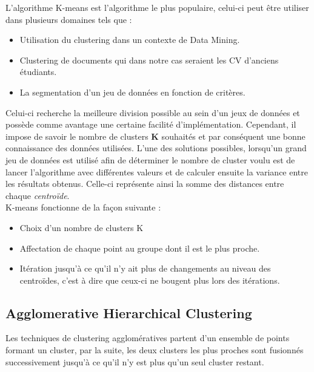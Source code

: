 \documentclass[memoire.tex]{subfiles}
\begin{document}
L'algorithme K-means est l'algorithme le plus populaire, celui-ci peut être utiliser dans plusieurs domaines tels que : 
\begin{itemize}
\item Utilisation du clustering dans un contexte de Data Mining.
\item Clustering de documents qui dans notre cas seraient les CV d'anciens étudiants.
\item La segmentation d'un jeu de données en fonction de critères.
\end{itemize}
Celui-ci recherche la meilleure division possible au sein d'un jeux de données \cite{ref5} et possède comme avantage une certaine facilité d'implémentation. Cependant, il impose de savoir le nombre de clusters \textbf{K} souhaités et par conséquent une bonne connaissance des données utilisées. L'une des solutions possibles, lorsqu'un grand jeu de données est utilisé afin de déterminer le nombre de cluster voulu est de lancer l'algorithme avec différentes valeurs et de calculer ensuite la variance entre les résultats obtenus. Celle-ci représente ainsi la somme des distances entre chaque \textit{centroïde}.\\
K-means fonctionne de la façon suivante : 
\begin{itemize}
\item Choix d'un nombre de clusters K
\item Affectation de chaque point au groupe dont il est le plus proche.
\item Itération jusqu'à ce qu'il n'y ait plus de changements au niveau des centroïdes, c'est à dire que ceux-ci ne bougent plus lors des itérations.
\end{itemize}

\subsection{Agglomerative Hierarchical Clustering}

Les techniques de clustering agglomératives partent d'un ensemble de points formant un cluster, par la suite, les deux clusters les plus proches sont fusionnés successivement jusqu'à ce qu'il n'y est plus qu'un seul cluster restant. \cite{ref4}
\newpage
\end{document}
